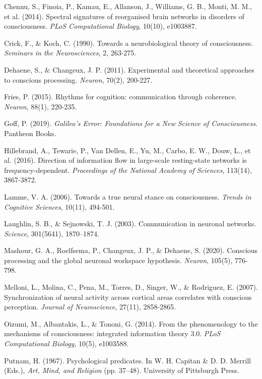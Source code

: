 \documentclass[12pt]{article}
\begin{document}
\begin{CJK}{UTF8}{gbsn}
\begin{thebibliography}{99}
     Chennu, S., Finoia, P., Kamau, E., Allanson, J., Williams, G. B., Monti, M. M., et al. (2014). Spectral signatures of reorganised brain networks in disorders of consciousness. \emph{PLoS Computational Biology}, 10(10), e1003887.
    
     Crick, F., \& Koch, C. (1990). Towards a neurobiological theory of consciousness. \emph{Seminars in the Neurosciences}, 2, 263-275.
    
     Dehaene, S., \& Changeux, J. P. (2011). Experimental and theoretical approaches to conscious processing. \emph{Neuron}, 70(2), 200-227.
    
     Fries, P. (2015). Rhythms for cognition: communication through coherence. \emph{Neuron}, 88(1), 220-235.
    
     Goff, P. (2019). \emph{Galileo's Error: Foundations for a New Science of Consciousness}. Pantheon Books.
    
     Hillebrand, A., Tewarie, P., Van Dellen, E., Yu, M., Carbo, E. W., Douw, L., et al. (2016). Direction of information flow in large-scale resting-state networks is frequency-dependent. \emph{Proceedings of the National Academy of Sciences}, 113(14), 3867-3872.
    
     Lamme, V. A. (2006). Towards a true neural stance on consciousness. \emph{Trends in Cognitive Sciences}, 10(11), 494-501.
    
     Laughlin, S. B., \& Sejnowski, T. J. (2003). Communication in neuronal networks. \emph{Science}, 301(5641), 1870–1874.
    
     Mashour, G. A., Roelfsema, P., Changeux, J. P., \& Dehaene, S. (2020). Conscious processing and the global neuronal workspace hypothesis. \emph{Neuron}, 105(5), 776-798.
    
     Melloni, L., Molina, C., Pena, M., Torres, D., Singer, W., \& Rodriguez, E. (2007). Synchronization of neural activity across cortical areas correlates with conscious perception. \emph{Journal of Neuroscience}, 27(11), 2858-2865.
    
     Oizumi, M., Albantakis, L., \& Tononi, G. (2014). From the phenomenology to the mechanisms of consciousness: integrated information theory 3.0. \emph{PLoS Computational Biology}, 10(5), e1003588.
    
     Putnam, H. (1967). Psychological predicates. In W. H. Capitan \& D. D. Merrill (Eds.), \emph{Art, Mind, and Religion} (pp. 37–48). University of Pittsburgh Press.
    

\end{thebibliography}
\end{CJK}
\end{document}
